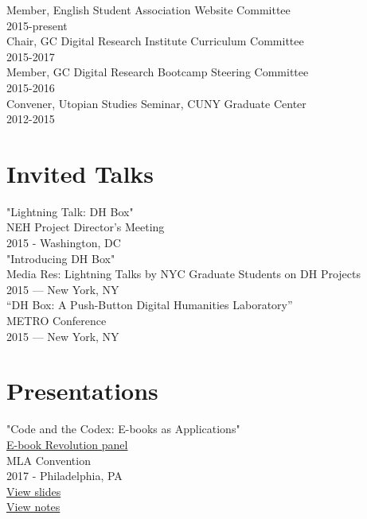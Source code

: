 \documentclass[11pt]{article}
\begin{document}
Member, English Student Association Website Committee\\
2015-present\\

Chair, GC Digital Research Institute Curriculum Committee\\
2015-2017\\

Member, GC Digital Research Bootcamp Steering Committee\\
2015-2016\\

Convener, Utopian Studies Seminar, CUNY Graduate Center\\
2012-2015\\

\section*{Invited Talks}
\label{sec:orgheadline6}
"Lightning Talk: DH Box"\\
NEH Project Director's Meeting\\
2015 - Washington, DC\\

"Introducing DH Box"\\
Media Res: Lightning Talks by NYC Graduate Students on DH Projects\\
2015 — New York, NY\\

“DH Box: A Push-Button Digital Humanities Laboratory”\\
METRO Conference\\
2015 — New York, NY\\

\section*{Presentations}
\label{sec:orgheadline7}
"Code and the Codex: E-books as Applications"\\
\href{https://apps.mla.org/program_details?prog_id=75&year=2017}{E-book Revolution panel}\\
MLA Convention\\
2017 - Philadelphia, PA\\
\href{http://htmlpreview.github.io/?https://github.com/smythp/ebooks-as-applications/blob/master/presentation.html#/sec-title-slide}{View slides}\\
\href{https://github.com/smythp/ebooks-as-applications#ebooks-as-applications}{View notes}\\
\end{document}
